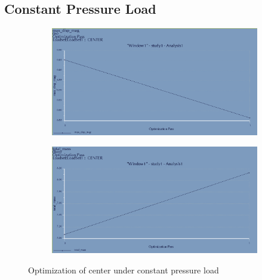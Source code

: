 \documentclass[12pt,letterpaper]{report}
\begin{document}
		\subsection{Constant Pressure Load}
		\graphicspath{ {./ScreenShots/Pressure/} }
		\begin{figure}[H]
			\centering
			\begin{subfigure}{.45\textwidth}
				\includegraphics[width=\textwidth]{CenterOptimDisp}
				\label{fig:CenterPressureOptimDispGraph}
			\end{subfigure}
			\begin{subfigure}{.45\textwidth}
				\includegraphics[width=\textwidth]{CenterOptimMass}
				\label{fig:CenterPressureOptimMassGraph}
			\end{subfigure}
			\caption{Optimization of center under constant pressure load}
		\end{figure}
		
\end{document}
